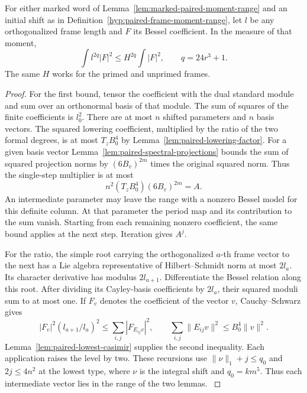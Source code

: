 


\begin{proposition}\label{prop:paired-frame-moments}
For either marked word of Lemma~\ref{lem:marked-paired-moment-range}
and an initial shift as in Definition~\ref{hyp:paired-frame-moment-range}, let \(l\) be any orthogonalized frame length and \(F\) its Bessel coefficient. In the measure of that moment, 
\[
 \int l^{2q}|F|^2\le H^{2q}\!\int|F|^2,\qquad q=24r^3+1.
\]
 The same \(H\) works for the primed and unprimed
frames.
\end{proposition}

\begin{proof}

For the first bound, tensor the coefficient with the dual standard
module and sum over an orthonormal basis of that module. The sum
of squares of the finite coefficients is \(l_0^2\). There are at
most \(n\) shifted parameters and \(n\) basis vectors. The
squared lowering coefficient, multiplied by the ratio of the two
formal degrees, is at most \(T_z B_0^4\) by
Lemma~\ref{lem:paired-lowering-factor}. For a given basis vector
Lemma~\ref{lem:paired-spectral-projections} bounds the sum of
squared projection norms by \((6B_v)^{2m}\) times the original squared norm. Thus the
single-step multiplier is at most
\[
           n^2(T_z B_0^4)(6B_v)^{2m}=A .
\]
An intermediate parameter may leave the range with a nonzero
Bessel model for this definite column. At that parameter the
period map and its contribution to the sum vanish. Starting from
each remaining nonzero coefficient, the same bound applies at
the next step. Iteration gives \(A^j\).

For the ratio, the simple root carrying the
orthogonalized \(a\)-th frame vector to the next has a Lie
algebra representative of Hilbert--Schmidt norm at most \(2l_a\).
Its character derivative has modulus \(2l_{a+1}\).
Differentiate the Bessel relation along this root. After dividing
its Cayley-basis coefficients by \(2l_a\), their squared moduli sum
to at most one. If \(F_v\) denotes the coefficient of the vector
\(v\), Cauchy--Schwarz gives
\[
   |F_v|^2(l_{a+1}/l_a)^2\le\sum_{i,j}|F_{E_{ij}v}|^2,\qquad
   \sum_{i,j}\|E_{ij}v\|^2\le B_0^4\|v\|^2 .
\]
Lemma~\ref{lem:paired-lowest-casimir} supplies the second
inequality. Each application
raises the level by two. These recursions use
\(\|\nu\|_1+j\le q_0\) and \(2j\le4n^2\) at the lowest type,
where \(\nu\) is the integral shift and \(q_0=km^5\).
Thus each intermediate vector lies in the range of the two lemmas.
\label{cor:absolute-amplitude-1}


\end{proof}
